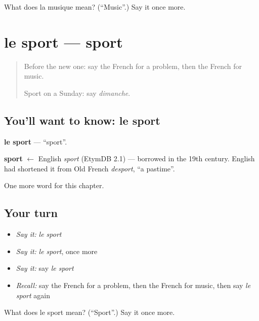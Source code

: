 \begin{tcolorbox}[breakable,colback=teal!4,colframe=teal!35!black,title={Before you move on}]
What does la musique mean? (\textquotedblleft{}Music\textquotedblright{}.) Say it once more.
\end{tcolorbox}
\section[le sport]{le sport — sport}

\label{lesson:FR-C128-sport}



\begin{quote}
Before the new one: say the French for a problem, then the French for music.

Sport on a Sunday: say \emph{dimanche}.
\end{quote}

\subsection*{You'll want to know: le sport}
\textbf{le sport} — \textquotedblleft{}sport\textquotedblright{}.

\begin{cousinweb}
\textbf{sport} $\leftarrow$ English \emph{sport} (EtymDB 2.1) — borrowed in the 19th century. English had shortened it from Old French \emph{desport}, \textquotedblleft{}a pastime\textquotedblright{}.
\end{cousinweb}

\begin{grammarlens}[title={What you've built}]
One more word for this chapter.
\end{grammarlens}

\subsection*{Your turn}
\begin{itemize}
\raggedright
  \item \emph{Say it:} \emph{le sport}
  \item \emph{Say it:} \emph{le sport}, once more
  \item \emph{Say it:} say \emph{le sport}
  \item \emph{Recall:} say the French for a problem, then the French for music, then say \emph{le sport} again
\end{itemize}

\begin{tcolorbox}[breakable,colback=teal!4,colframe=teal!35!black,title={Before you move on}]
What does le sport mean? (\textquotedblleft{}Sport\textquotedblright{}.) Say it once more.
\end{tcolorbox}

